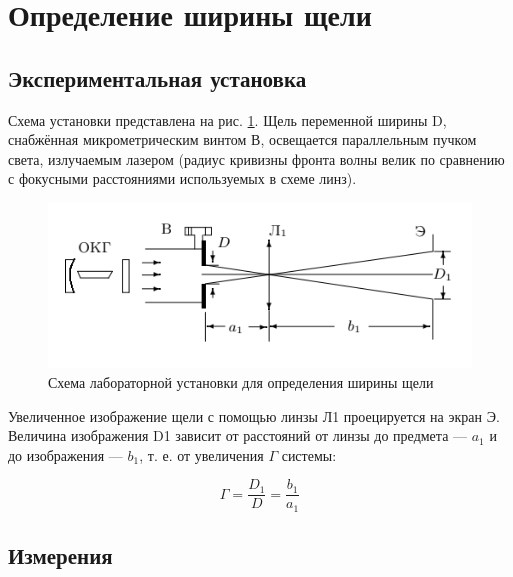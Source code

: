 \documentclass[a4paper, 12pt]{article}
\begin{document}
\section*{Определение ширины щели}
\label{section_I}
\subsection*{Экспериментальная установка}

Схема установки представлена на рис. \ref{fig:scheme_I}. Щель переменной ширины D, снабжённая микрометрическим винтом В, освещается параллельным пучком света, излучаемым лазером (радиус кривизны фронта волны велик по сравнению с фокусными расстояниями используемых в схеме линз).

\begin{figure}[h]
    \centering
    \includegraphics[width=15cm]{scheme_I.png}
    \caption{Схема лабораторной установки для определения ширины щели}
    \label{fig:scheme_I}
\end{figure}

Увеличенное изображение щели с помощью линзы Л1 проецируется на экран Э. Величина изображения D1 зависит от расстояний от линзы до предмета — $a_1$ и до изображения — $b_1$, т. е. от увеличения $\Gamma$ системы:

$$\Gamma=\frac{D_{1}}{D}=\frac{b_{1}}{a_{1}}$$

\newpage

\subsection*{Измерения}
\end{document}
